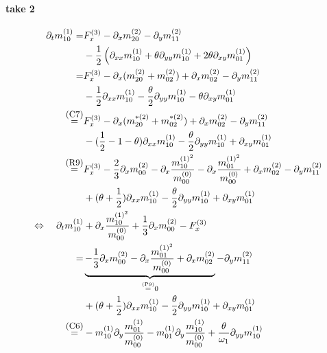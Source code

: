 \documentclass{article}
\begin{document}
\newpage
\paragraph{take 2}
\begin{align*}
  \partial_t m_{10}^{(1)}
    =&
    F_x^{(3)}
    - \partial_x m_{20}^{(2)} - \partial_y m_{11}^{(2)} \\
    &
    - \frac{1}{2} \left(\partial_{xx} m_{10}^{(1)} + \theta\partial_{yy} m_{10}^{(1)} + 2\theta\partial_{xy} m_{01}^{(1)}\right)
    \\=&
    F_x^{(3)}
    - \partial_x (m_{20}^{(2)} + m_{02}^{(2)}) + \partial_x m_{02}^{(2)} - \partial_y m_{11}^{(2)}
    \\ &
    - \frac{1}{2} \partial_{xx} m_{10}^{(1)} - \frac{\theta}{2}\partial_{yy} m_{10}^{(1)} - \theta\partial_{xy} m_{01}^{(1)}
    \\ \overset{\text{\small(C7)}}{=} &
    F_x^{(3)}
    - \partial_x (m_{20}^{*(2)} + m_{02}^{*(2)}) + \partial_x m_{02}^{(2)} - \partial_y m_{11}^{(2)}
    \\ &
    - (\frac{1}{2}-1-\theta) \partial_{xx} m_{10}^{(1)} - \frac{\theta}{2}\partial_{yy} m_{10}^{(1)} + \partial_{xy} m_{01}^{(1)}
    \\ \overset{\text{\small(R9)}}{=} &
    F_x^{(3)}
    - \frac{2}{3}\partial_x m_{00}^{(2)}
    - \partial_x \frac{ m_{10}^{{(1)}^2}}{ m_{00}^{(0)}}
    - \partial_x \frac{ m_{01}^{{(1)}^2}}{ m_{00}^{(0)}}
    + \partial_x m_{02}^{(2)} - \partial_y m_{11}^{(2)}
    \\ &
    + (\theta + \frac{1}{2}) \partial_{xx} m_{10}^{(1)} - \frac{\theta}{2}\partial_{yy} m_{10}^{(1)} + \partial_{xy} m_{01}^{(1)}
    \\\Leftrightarrow\quad   \partial_t m_{10}^{(1)} &
    + \partial_x \frac{ m_{10}^{{(1)}^2}}{ m_{00}^{(0)}}
    + \frac{1}{3}\partial_x m_{00}^{(2)}
    - F_x^{(3)}
    \\ = &
    \underbrace{- \frac{1}{3}\partial_x m_{00}^{(2)}
    - \partial_x \frac{ m_{01}^{{(1)}^2}}{ m_{00}^{(0)}}
    + \partial_x m_{02}^{(2)}}_{\overset{\text{\tiny(P9)}}{=} 0}
    - \partial_y m_{11}^{(2)}
    \\ &
    + (\theta + \frac{1}{2}) \partial_{xx} m_{10}^{(1)} - \frac{\theta}{2}\partial_{yy} m_{10}^{(1)} + \partial_{xy} m_{01}^{(1)}
    \\ \overset{\text{\small(C6)}}{=} &
    -m_{10}^{(1)}\partial_y \frac{ m_{01}^{(1)}}{m_{00}^{(0)}}
    -m_{01}^{(1)}\partial_y \frac{ m_{10}^{(1)}}{m_{00}^{(0)}}
    + \frac{\theta}{\omega_1}\partial_{yy} m_{10}^{(1)}

\end{align*}
\end{document}

